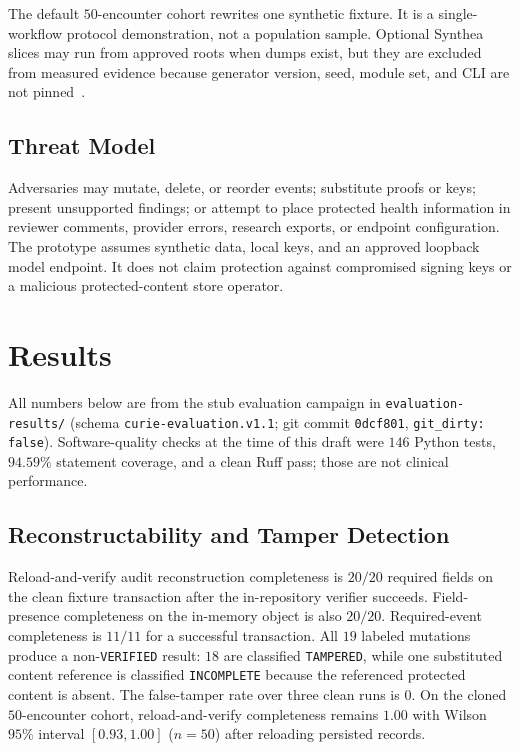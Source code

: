 \documentclass[journal]{IEEEtran}
\begin{document}
The default $50$-encounter cohort rewrites one synthetic fixture. It is a
single-workflow protocol demonstration, not a population sample.
Optional Synthea slices may run from approved roots when dumps exist, but they
are excluded from measured evidence because generator version, seed, module set,
and CLI are not pinned~\cite{walonoski2018synthea}.

\subsection{Threat Model}
\label{sec:threat}

Adversaries may mutate, delete, or reorder events; substitute proofs or keys;
present unsupported findings; or attempt to place protected health information
in reviewer comments, provider errors, research exports, or endpoint
configuration. The prototype assumes synthetic data, local keys, and an
approved loopback model endpoint. It does not claim protection against
compromised signing keys or a malicious protected-content store operator.

\section{Results}
\label{sec:results}

All numbers below are from the stub evaluation campaign in
\texttt{evaluation-results/} (schema \texttt{curie-evaluation.v1.1}; git commit
\texttt{0dcf801}, \texttt{git\_dirty: false}).
Software-quality checks at the time of this draft were $146$ Python tests,
$94.59\%$ statement coverage, and a clean Ruff pass; those are not clinical
performance.

\subsection{Reconstructability and Tamper Detection}
Reload-and-verify audit reconstruction completeness is $20/20$ required
fields on the clean fixture transaction after the in-repository verifier
succeeds. Field-presence completeness on the in-memory object is also
$20/20$. Required-event completeness is $11/11$ for a successful transaction.
All $19$ labeled mutations produce a non-\texttt{VERIFIED} result: $18$ are
classified \texttt{TAMPERED}, while one substituted content reference is
classified \texttt{INCOMPLETE} because the referenced protected content is
absent. The false-tamper rate over three clean runs is $0$. On the cloned $50$-encounter cohort,
reload-and-verify completeness remains $1.00$ with Wilson $95\%$ interval
$[0.93, 1.00]$ ($n=50$) after reloading persisted records.
\end{document}
